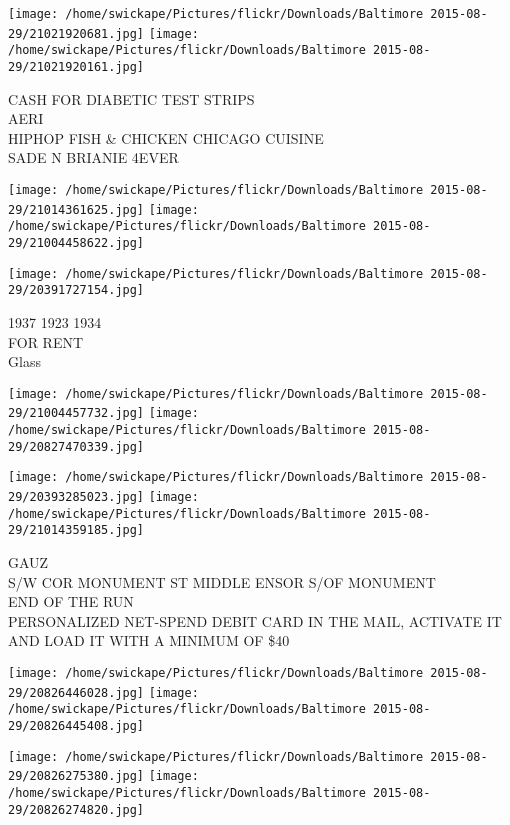 \documentclass[10pt,letterpaper]{article}
\begin{document}
\texttt{[image: /home/swickape/Pictures/flickr/Downloads/Baltimore 2015-08-29/21021920681.jpg]}
\texttt{[image: /home/swickape/Pictures/flickr/Downloads/Baltimore 2015-08-29/21021920161.jpg]}

CASH FOR DIABETIC TEST STRIPS\\
AERI\\
HIPHOP FISH \& CHICKEN CHICAGO CUISINE\\
SADE N BRIANIE 4EVER\\
\pagebreak

\texttt{[image: /home/swickape/Pictures/flickr/Downloads/Baltimore 2015-08-29/21014361625.jpg]}
\texttt{[image: /home/swickape/Pictures/flickr/Downloads/Baltimore 2015-08-29/21004458622.jpg]}

\vspace{0.25in}
\texttt{[image: /home/swickape/Pictures/flickr/Downloads/Baltimore 2015-08-29/20391727154.jpg]}

1937 1923 1934\\
FOR RENT\\
Glass\\
\pagebreak

\texttt{[image: /home/swickape/Pictures/flickr/Downloads/Baltimore 2015-08-29/21004457732.jpg]}
\texttt{[image: /home/swickape/Pictures/flickr/Downloads/Baltimore 2015-08-29/20827470339.jpg]}

\texttt{[image: /home/swickape/Pictures/flickr/Downloads/Baltimore 2015-08-29/20393285023.jpg]}
\texttt{[image: /home/swickape/Pictures/flickr/Downloads/Baltimore 2015-08-29/21014359185.jpg]}

GAUZ\\
S/W COR MONUMENT ST MIDDLE ENSOR S/OF MONUMENT\\
END OF THE RUN\\
PERSONALIZED NET{-}SPEND DEBIT CARD IN THE MAIL, ACTIVATE IT AND LOAD IT WITH A MINIMUM OF \$40\\
\pagebreak

\texttt{[image: /home/swickape/Pictures/flickr/Downloads/Baltimore 2015-08-29/20826446028.jpg]}
\texttt{[image: /home/swickape/Pictures/flickr/Downloads/Baltimore 2015-08-29/20826445408.jpg]}

\texttt{[image: /home/swickape/Pictures/flickr/Downloads/Baltimore 2015-08-29/20826275380.jpg]}
\texttt{[image: /home/swickape/Pictures/flickr/Downloads/Baltimore 2015-08-29/20826274820.jpg]}
\end{document}

